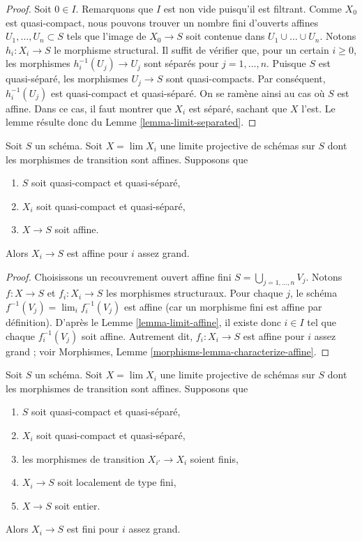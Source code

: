\begin{proof}
Soit $0 \in I$. Remarquons que $I$ est non vide puisqu'il est filtrant.
Comme $X_0$ est quasi-compact, nous pouvons trouver un nombre fini d'ouverts
affines $U_1, \ldots, U_n \subset S$ tels que l'image de $X_0 \to S$ soit
contenue dans $U_1 \cup \ldots \cup U_n$. Notons $h_i : X_i \to S$ le
morphisme structural. Il suffit de vérifier que, pour un certain $i \geq 0$,
les morphismes $h_i^{-1}(U_j) \to U_j$ sont séparés pour
$j = 1, \ldots,  n$. Puisque $S$ est quasi-séparé, les morphismes
$U_j \to S$ sont quasi-compacts. Par conséquent, $h_i^{-1}(U_j)$ est
quasi-compact et quasi-séparé. On se ramène ainsi au cas où $S$ est affine.
Dans ce cas, il faut montrer que $X_i$ est séparé, sachant que $X$ l'est.
Le lemme résulte donc du Lemme \ref{lemma-limit-separated}.
\end{proof}

\begin{lemma}
\label{lemma-eventually-affine}
Soit $S$ un schéma. Soit $X = \lim X_i$ une limite projective de schémas sur
$S$ dont les morphismes de transition sont affines. Supposons que
\begin{enumerate}
\item $S$ soit quasi-compact et quasi-séparé,
\item $X_i$ soit quasi-compact et quasi-séparé,
\item $X \to S$ soit affine.
\end{enumerate}
Alors $X_i \to S$ est affine pour $i$ assez grand.
\end{lemma}

\begin{proof}
Choisissons un recouvrement ouvert affine fini
$S = \bigcup_{j = 1, \ldots, n} V_j$. Notons $f : X \to S$ et
$f_i : X_i \to S$ les morphismes structuraux. Pour chaque $j$, le schéma
$f^{-1}(V_j) = \lim_i f_i^{-1}(V_j)$ est affine (car un morphisme fini est
affine par définition). D'après le Lemme \ref{lemma-limit-affine}, il existe
donc $i \in I$ tel que chaque $f_i^{-1}(V_j)$ soit affine. Autrement dit,
$f_i : X_i \to S$ est affine pour $i$ assez grand ; voir Morphismes,
Lemme \ref{morphisms-lemma-characterize-affine}.
\end{proof}

\begin{lemma}
\label{lemma-eventually-finite}
Soit $S$ un schéma. Soit $X = \lim X_i$ une limite projective de schémas sur
$S$ dont les morphismes de transition sont affines. Supposons que
\begin{enumerate}
\item $S$ soit quasi-compact et quasi-séparé,
\item $X_i$ soit quasi-compact et quasi-séparé,
\item les morphismes de transition $X_{i'} \to X_i$ soient finis,
\item $X_i \to S$ soit localement de type fini,
\item $X \to S$ soit entier.
\end{enumerate}
Alors $X_i \to S$ est fini pour $i$ assez grand.
\end{lemma}


